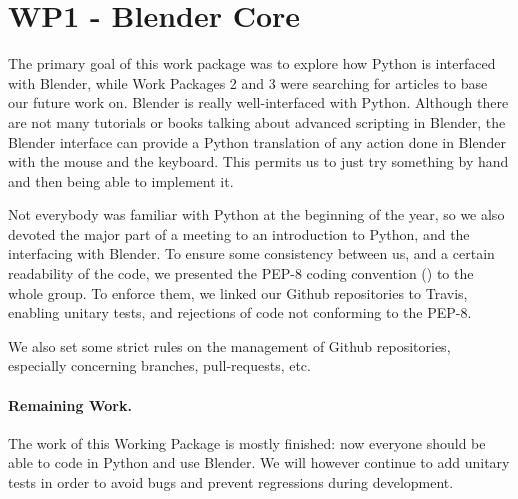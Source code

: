 \section{WP1 - Blender Core}

The primary goal of this work package was to explore how Python is interfaced with Blender, while Work Packages 2 and 3 were searching for articles to base our future work on. Blender is really well-interfaced with Python. Although there are not many tutorials or books talking about advanced scripting in Blender, the Blender interface can provide a Python translation of any action done in Blender with the mouse and the keyboard. This permits us to just try something by hand and then being able to implement it. 
\par Not everybody was familiar with Python at the beginning of the year, so we also devoted the major part of a meeting to an introduction to Python, and the interfacing with Blender. To ensure some consistency between us, and a certain readability of the code, we presented the PEP-8 coding convention (\cite{pep8}) to the whole group. To enforce them, we linked our Github repositories to Travis, enabling unitary tests, and rejections of code not conforming to the PEP-8.
\par We also set some strict rules on the management of Github repositories, especially concerning branches, pull-requests, etc.
\paragraph{Remaining Work.} The work of this Working Package is mostly finished: now everyone should be able to code in Python and use Blender. We will however continue to add unitary tests in order to avoid bugs and prevent regressions during development. 
